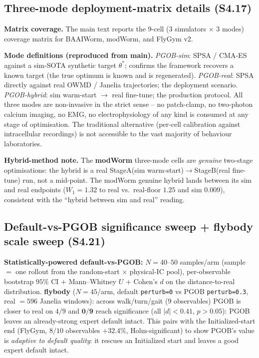 \documentclass[11pt]{article}
\begin{document}
\subsection{Three-mode deployment-matrix details (S4.17)}
\label{si:s4_17}

\textbf{Matrix coverage.} The main text reports the 9-cell ($3$ simulators $\times$ 3 modes) coverage matrix for BAAIWorm, modWorm, and FlyGym v2.

\textbf{Mode definitions (reproduced from main).} \emph{PGOB-sim}: SPSA / CMA-ES against a sim-SOTA synthetic target $\theta^{*}$; confirms the framework recovers a known target (the true optimum is known and is regenerated). \emph{PGOB-real}: SPSA directly against real OWMD / Janelia trajectories; the deployment scenario. \emph{PGOB-hybrid}: sim warm-start $\to$ real fine-tune; the production protocol. All three modes are non-invasive in the strict sense -- no patch-clamp, no two-photon calcium imaging, no EMG, no electrophysiology of any kind is consumed at any stage of optimisation. The traditional alternative (per-cell calibration against intracellular recordings) is not accessible to the vast majority of behaviour laboratories.

\textbf{Hybrid-method note.} The \textbf{modWorm} three-mode cells are \emph{genuine} two-stage optimisations: the hybrid is a real StageA(sim warm-start)$\to$StageB(real fine-tune) run, not a mid-point. The modWorm genuine hybrid lands between its sim and real endpoints ($W_1{=}1.32$ to real vs.\ real-floor $1.25$ and sim $0.009$), consistent with the ``hybrid between sim and real'' reading.

\subsection{Default-vs-PGOB significance sweep + flybody scale sweep (S4.21)}
\label{si:dvp_nsample}
\textbf{Statistically-powered default-vs-PGOB:} $N{=}40$--$50$ samples/arm (sample $=$ one rollout from the random-start $\times$ physical-IC pool), per-observable bootstrap $95\%$ CI $+$ Mann--Whitney $U$ $+$ Cohen's $d$ on the distance-to-real distribution. \textbf{flybody} ($N{=}45$/arm, default \texttt{perturb=0} vs PGOB \texttt{perturb=0.3}, real $=596$ Janelia windows): across walk/turn/gait ($9$ observables) PGOB is closer to real on $4/9$ and $\mathbf{0/9}$ reach significance (all $|d|<0.41$, $p>0.05$): PGOB leaves an already-strong expert default intact. This pairs with the Initialized-start end (FlyGym, $8/10$ observables $+32.4\%$, Holm-significant) to show PGOB's value is \emph{adaptive to default quality}: it rescues an Initialized start and leaves a good expert default intact.
\end{document}
